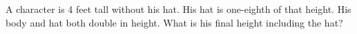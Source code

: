 A character is 4 feet tall without his hat. His hat is one-eighth of that height. His body and hat both double in height. What is his final height including the hat?

